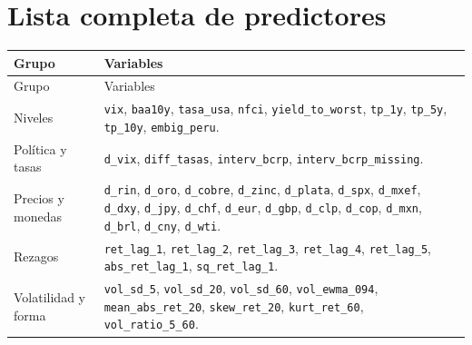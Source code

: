 \documentclass[11pt,a4paper]{article}
\begin{document}
\section{Lista completa de predictores}

\small
\begin{longtable}{p{}p{}}
\toprule
Grupo & Variables \\
\midrule
\endfirsthead
\toprule
Grupo & Variables \\
\midrule
\endhead
Niveles &
\texttt{vix}, \texttt{baa10y}, \texttt{tasa\_usa}, \texttt{nfci},
\texttt{yield\_to\_worst}, \texttt{tp\_1y}, \texttt{tp\_5y},
\texttt{tp\_10y}, \texttt{embig\_peru}. \\
Política y tasas &
\texttt{d\_vix}, \texttt{diff\_tasas}, \texttt{interv\_bcrp},
\texttt{interv\_bcrp\_missing}. \\
Precios y monedas &
\texttt{d\_rin}, \texttt{d\_oro}, \texttt{d\_cobre},
\texttt{d\_zinc}, \texttt{d\_plata}, \texttt{d\_spx},
\texttt{d\_mxef}, \texttt{d\_dxy}, \texttt{d\_jpy},
\texttt{d\_chf}, \texttt{d\_eur}, \texttt{d\_gbp},
\texttt{d\_clp}, \texttt{d\_cop}, \texttt{d\_mxn},
\texttt{d\_brl}, \texttt{d\_cny}, \texttt{d\_wti}. \\
Rezagos &
\texttt{ret\_lag\_1}, \texttt{ret\_lag\_2},
\texttt{ret\_lag\_3}, \texttt{ret\_lag\_4},
\texttt{ret\_lag\_5}, \texttt{abs\_ret\_lag\_1},
\texttt{sq\_ret\_lag\_1}. \\
Volatilidad y forma &
\texttt{vol\_sd\_5}, \texttt{vol\_sd\_20}, \texttt{vol\_sd\_60},
\texttt{vol\_ewma\_094}, \texttt{mean\_abs\_ret\_20},
\texttt{skew\_ret\_20}, \texttt{kurt\_ret\_60},
\texttt{vol\_ratio\_5\_60}. \\
\bottomrule
\end{longtable}
\normalsize
\end{document}
